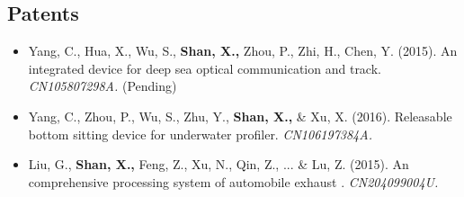 \documentclass[11pt,a4paper,sans]{moderncv}         %
\begin{document}
\subsection{Patents} 

    \begin{itemize}

    \item{Yang, C., Hua, X., Wu, S., \textbf{Shan, X.,} Zhou, P., Zhi, H., Chen, Y. (2015). An integrated device for deep sea optical communication and track. \textit{CN105807298A.} (Pending)}

    \vspace{3pt}

    \item{Yang, C., Zhou, P., Wu, S., Zhu, Y., \textbf{Shan, X.,} \& Xu, X. (2016). Releasable bottom sitting device for underwater profiler. \textit{CN106197384A.}}

    \vspace{3pt}

    \item{Liu, G., \textbf{Shan, X.,} Feng, Z., Xu, N., Qin, Z., ... \& Lu, Z. (2015). An comprehensive processing system of automobile exhaust . \textit{CN204099004U.}}

    \vspace{3pt}

\end{itemize}


    

\end{document}
